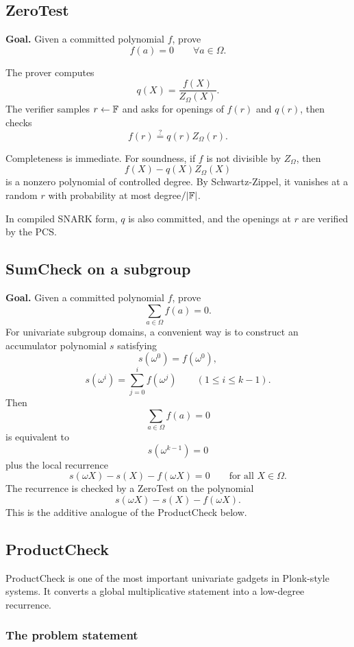 \subsection{ZeroTest}

\textbf{Goal.} Given a committed polynomial $f$, prove
\[
    f(a)=0\qquad\forall a\in\Omega.
\]

The prover computes
\[
    q(X)=\frac{f(X)}{Z_\Omega(X)}.
\]
The verifier samples $r\leftarrow\mathbb{F}$ and asks for openings of $f(r)$ and $q(r)$, then checks
\[
    f(r)\stackrel{?}{=}q(r)Z_\Omega(r).
\]

Completeness is immediate. For soundness, if $f$ is not divisible by $Z_\Omega$, then
\[
    f(X)-q(X)Z_\Omega(X)
\]
is a nonzero polynomial of controlled degree. By Schwartz-Zippel, it vanishes at a random $r$ with probability at most degree$/|\mathbb{F}|$.

In compiled SNARK form, $q$ is also committed, and the openings at $r$ are verified by the PCS.

\subsection{SumCheck on a subgroup}

\textbf{Goal.} Given a committed polynomial $f$, prove
\[
    \sum_{a\in\Omega}f(a)=0.
\]
For univariate subgroup domains, a convenient way is to construct an accumulator polynomial $s$ satisfying
\[
    s(\omega^0)=f(\omega^0),
\]
\[
    s(\omega^i)=\sum_{j=0}^{i} f(\omega^j)
    \qquad (1\le i\le k-1).
\]
Then
\[
    \sum_{a\in\Omega} f(a)=0
\]
is equivalent to
\[
    s(\omega^{k-1})=0
\]
plus the local recurrence
\[
    s(\omega X)-s(X)-f(\omega X)=0
    \qquad\text{for all }X\in\Omega.
\]
The recurrence is checked by a ZeroTest on the polynomial
\[
    s(\omega X)-s(X)-f(\omega X).
\]
This is the additive analogue of the ProductCheck below.

\subsection{ProductCheck}

ProductCheck is one of the most important univariate gadgets in Plonk-style systems. It converts a global multiplicative statement into a low-degree recurrence.

\subsubsection*{The problem statement}

